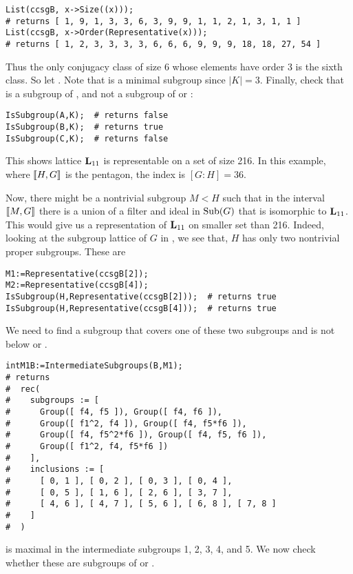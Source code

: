 {\small 
\begin{verbatim}
List(ccsgB, x->Size((x)));
# returns [ 1, 9, 1, 3, 3, 6, 3, 9, 9, 1, 1, 2, 1, 3, 1, 1 ]
List(ccsgB, x->Order(Representative(x)));
# returns [ 1, 2, 3, 3, 3, 3, 6, 6, 6, 9, 9, 9, 18, 18, 27, 54 ]
\end{verbatim}
}
Thus the only conjugacy class of size 6 whose elements 
have order 3 is the sixth class.  So let
.
Note that  is a minimal subgroup since $|K|=3$.  Finally,
check that  is a subgroup of , and not a subgroup of
 or :
{\small 
\begin{verbatim}
IsSubgroup(A,K);  # returns false
IsSubgroup(B,K);  # returns true
IsSubgroup(C,K);  # returns false
\end{verbatim}
}
This shows lattice $\mathbf{L}_{11}$ is representable on a set of size 216.
In this example, where $\llbracket H,G \rrbracket$ is the pentagon, the index is $[G:H]=36$.  

Now, there might be a nontrivial subgroup $M < H$ such that in the interval
$\llbracket M, G \rrbracket$ there is a union of a filter and ideal in $\operatorname{Sub}(G)$ that is isomorphic to
$\mathbf{L}_{11}$. This would give us a representation of $\mathbf{L}_{11}$ on smaller set than 216.
Indeed, looking at the subgroup lattice of $G$ in \xgap, we see that, 
$H$ has only two nontrivial proper subgroups.  These are

{\small 
\begin{verbatim}
M1:=Representative(ccsgB[2]);
M2:=Representative(ccsgB[4]);
IsSubgroup(H,Representative(ccsgB[2]));  # returns true
IsSubgroup(H,Representative(ccsgB[4]));  # returns true
\end{verbatim}
}
We need to find a subgroup that covers one of these two subgroups
and is not below  or .
{\small 
\begin{verbatim}
intM1B:=IntermediateSubgroups(B,M1);
# returns 
#  rec( 
#    subgroups := [ 
#      Group([ f4, f5 ]), Group([ f4, f6 ]), 
#      Group([ f1^2, f4 ]), Group([ f4, f5*f6 ]), 
#      Group([ f4, f5^2*f6 ]), Group([ f4, f5, f6 ]), 
#      Group([ f1^2, f4, f5*f6 ]) 
#    ], 
#    inclusions := [ 
#      [ 0, 1 ], [ 0, 2 ], [ 0, 3 ], [ 0, 4 ], 
#      [ 0, 5 ], [ 1, 6 ], [ 2, 6 ], [ 3, 7 ], 
#      [ 4, 6 ], [ 4, 7 ], [ 5, 6 ], [ 6, 8 ], [ 7, 8 ] 
#    ] 
#  )
\end{verbatim}
}
 is maximal in the intermediate subgroups 1, 2, 3, 4, and 5.
We now check whether these are subgroups of  or .

